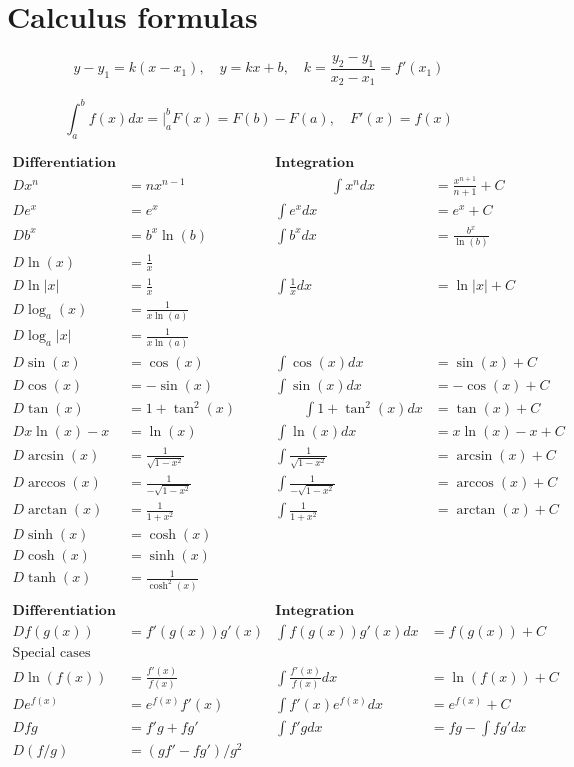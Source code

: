 \documentclass[12pt]{article}
\begin{document}
\newpage
\section*{Calculus formulas}

$$y-y_1=k(x-x_1),\quad y=kx+b,\quad k=\frac{y_2-y_1}{x_2-x_1}=f'(x_1)$$

$$
\int_a^b f(x)dx=\bigg |_a^b F(x)=F(b)-F(a),\quad F'(x)=f(x)
$$

$$
\begin{array}{rl|rl}
\textbf{Differentiation} && \textbf{Integration}&\\[2mm]
Dx^n&=nx^{n-1}     \qquad\qquad&\qquad\qquad\int x^ndx&=\frac{x^{n+1}}{n+1}+C \\[2mm]
De^x&=e^x &\int e^xdx&=e^x+C\\[2mm]
Db^x&=b^x\ln(b) & \int b^xdx&=\frac{b^x}{\ln(b)}\\[2mm]
D\ln(x)&=\frac{1}{x} &&\\[2mm]
D\ln|x|&=\frac{1}{x} &\int\frac{1}{x}dx&=\ln|x|+C\\[2mm]
D\log_a(x)&=\frac{1}{x\ln(a)} &&\\[2mm]
D\log_a|x|&=\frac{1}{x\ln(a)} &&\\[2mm]
D\sin(x)&=\cos(x)   &\int\cos(x)dx&=\sin(x)+C\\[2mm]
D\cos(x)&=-\sin(x)  &\int\sin(x)dx&=-\cos(x)+C\\[2mm]
D\tan(x)&=1+\tan^2(x) \qquad&\qquad\int 1+\tan^2(x)dx&=\tan(x)+C\\[2mm]

Dx\ln(x)-x&=\ln(x) & \int\ln(x)dx&=x\ln(x)-x+C\\[10mm]

D\arcsin(x)&=\frac{1}{\sqrt{1-x^2}} & \int\frac{1}{\sqrt{1-x^2}}&=\arcsin(x)+C\\
D\arccos(x)&=\frac{1}{-\sqrt{1-x^2}} & \int\frac{1}{-\sqrt{1-x^2}}&=\arccos(x)+C\\
D\arctan(x)&=\frac{1}{1+x^2} & \int\frac{1}{1+x^2}&=\arctan(x)+C\\

D\sinh(x)&=\cosh(x) &&\\
D\cosh(x)&=\sinh(x) &&\\
D\tanh(x)&=\frac{1}{\cosh^2(x)} &&\\
\end{array}  
$$
\vspace{1cm}
$$
\begin{array}{rl|rl}
\textbf{Differentiation} && \textbf{Integration}&\\[2mm]
D f(g(x))&=f'(g(x))g'(x) & \int f(g(x))g'(x)dx&=f(g(x))+C\\[2mm]
\textrm{Special cases} &&&\\
D\ln(f(x))&=\frac{f'(x)}{f(x)} & \int \frac{f'(x)}{f(x)}dx&=\ln(f(x))+C\\[2mm]
D e^{f(x)}&=e^{f(x)}f'(x) & \int f'(x)e^{f(x)}dx&=e^{f(x)}+C\\[10mm]
D fg&=f'g+fg'& \int f'g dx&=fg-\int fg'dx\\[2mm]
D (f/g)&=(gf'-fg')/g^2 &&\\[2mm]
\end{array}  
$$
\end{document}
